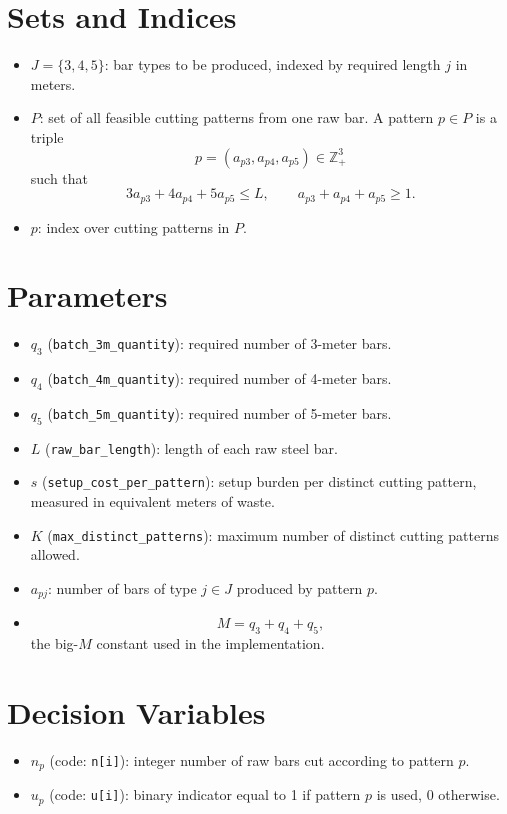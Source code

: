\section*{Sets and Indices}

\begin{itemize}
\item $J = \{3,4,5\}$: bar types to be produced, indexed by required length $j$ in meters.
\item $P$: set of all feasible cutting patterns from one raw bar. A pattern $p \in P$ is a triple
\[
p=(a_{p3},a_{p4},a_{p5}) \in \mathbb{Z}_+^3
\]
such that
\[
3a_{p3}+4a_{p4}+5a_{p5} \le L,
\qquad
a_{p3}+a_{p4}+a_{p5} \ge 1.
\]
\item $p$: index over cutting patterns in $P$.
\end{itemize}

\section*{Parameters}

\begin{itemize}
\item $q_3$ (\texttt{batch\_3m\_quantity}): required number of 3-meter bars.
\item $q_4$ (\texttt{batch\_4m\_quantity}): required number of 4-meter bars.
\item $q_5$ (\texttt{batch\_5m\_quantity}): required number of 5-meter bars.
\item $L$ (\texttt{raw\_bar\_length}): length of each raw steel bar.
\item $s$ (\texttt{setup\_cost\_per\_pattern}): setup burden per distinct cutting pattern, measured in equivalent meters of waste.
\item $K$ (\texttt{max\_distinct\_patterns}): maximum number of distinct cutting patterns allowed.
\item $a_{pj}$: number of bars of type $j \in J$ produced by pattern $p$.
\item
\[
M = q_3+q_4+q_5,
\]
the big-$M$ constant used in the implementation.
\end{itemize}

\section*{Decision Variables}

\begin{itemize}
\item $n_p$ (code: \texttt{n[i]}): integer number of raw bars cut according to pattern $p$.
\item $u_p$ (code: \texttt{u[i]}): binary indicator equal to 1 if pattern $p$ is used, 0 otherwise.
\end{itemize}


